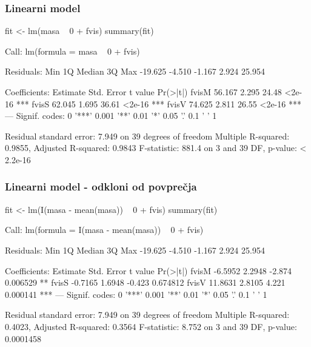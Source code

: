 \begin{frame}[fragile]
\frametitle{Linearni model}
\begin{Schunk}
\begin{Sinput}
  fit <- lm(masa ~ 0 + fvis)
  summary(fit)
\end{Sinput}
\begin{Soutput}
Call:
lm(formula = masa ~ 0 + fvis)

Residuals:
    Min      1Q  Median      3Q     Max 
-19.625  -4.510  -1.167   2.924  25.954 

Coefficients:
      Estimate Std. Error t value Pr(>|t|)    
fvisM   56.167      2.295   24.48   <2e-16 ***
fvisS   62.045      1.695   36.61   <2e-16 ***
fvisV   74.625      2.811   26.55   <2e-16 ***
---
Signif. codes:  0 '***' 0.001 '**' 0.01 '*' 0.05 '.' 0.1 ' ' 1 

Residual standard error: 7.949 on 39 degrees of freedom
Multiple R-squared: 0.9855,	Adjusted R-squared: 0.9843 
F-statistic: 881.4 on 3 and 39 DF,  p-value: < 2.2e-16 
\end{Soutput}
\end{Schunk}
\end{frame}

\begin{frame}[fragile]
\frametitle{Linearni model - odkloni od povprečja}
\begin{Schunk}
\begin{Sinput}
  fit <- lm(I(masa - mean(masa)) ~ 0 + fvis)
  summary(fit)
\end{Sinput}
\begin{Soutput}
Call:
lm(formula = I(masa - mean(masa)) ~ 0 + fvis)

Residuals:
    Min      1Q  Median      3Q     Max 
-19.625  -4.510  -1.167   2.924  25.954 

Coefficients:
      Estimate Std. Error t value Pr(>|t|)    
fvisM  -6.5952     2.2948  -2.874 0.006529 ** 
fvisS  -0.7165     1.6948  -0.423 0.674812    
fvisV  11.8631     2.8105   4.221 0.000141 ***
---
Signif. codes:  0 '***' 0.001 '**' 0.01 '*' 0.05 '.' 0.1 ' ' 1 

Residual standard error: 7.949 on 39 degrees of freedom
Multiple R-squared: 0.4023,	Adjusted R-squared: 0.3564 
F-statistic: 8.752 on 3 and 39 DF,  p-value: 0.0001458 
\end{Soutput}
\end{Schunk}
\end{frame}





